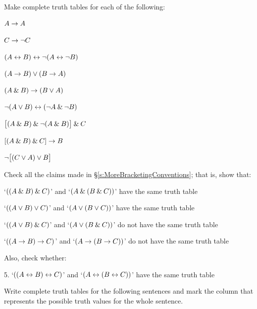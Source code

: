 \practiceproblems\label{pr.TT.TTorC}
\problempart
Make complete truth tables for each of the following:
\begin{earg}
\item $A \rightarrow A$ %
\item $C \rightarrow{\neg} C$ %
\item $(A \leftrightarrow B) \leftrightarrow {\neg}(A\leftrightarrow {\neg} B)$ %
\item $(A \rightarrow B) \vee (B \rightarrow A)$ %
\item $(A \mathbin{\&} B) \rightarrow (B \vee A)$  %
\item ${\neg}(A \vee B) \leftrightarrow ({\neg} A \mathbin{\&} {\neg} B)$ %
\item $\bigl[(A\mathbin{\&} B) \mathbin{\&}{\neg}(A\mathbin{\&} B)\bigr] \mathbin{\&} C$ %
\item $[(A \mathbin{\&} B) \mathbin{\&} C] \rightarrow B$ %
\item ${\neg}\bigl[(C\vee A) \vee B\bigr]$ %
\end{earg}
\problempart
Check all the claims made in \S\ref{s:MoreBracketingConventions}; that is, show that:
\begin{earg}
	\item `$((A \mathbin{\&} B) \mathbin{\&} C)$' and `$(A \mathbin{\&} (B \mathbin{\&} C))$' have the same truth table
	\item `$((A \vee B) \vee C)$' and `$(A \vee (B \vee C))$' have the same truth table
	\item `$((A \vee B) \mathbin{\&} C)$' and `$(A \vee (B \mathbin{\&} C))$' do not have the same truth table
	\item `$((A \rightarrow B) \rightarrow C)$' and `$(A \rightarrow (B \rightarrow C))$' do not have the same truth table
\end{earg}
Also, check whether:
\begin{earg}
	\item[5.] `$((A \leftrightarrow B) \leftrightarrow C)$' and `$(A \leftrightarrow (B \leftrightarrow C))$' have the same truth table
\end{earg}

\problempart
Write complete truth tables for the following sentences and mark the column that represents the possible truth values for the whole sentence.

